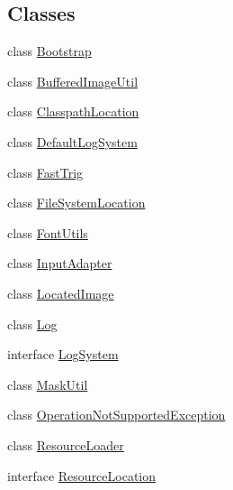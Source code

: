 \subsection*{Classes}
\begin{DoxyCompactItemize}
\item 
class \mbox{\hyperlink{classorg_1_1newdawn_1_1slick_1_1util_1_1_bootstrap}{Bootstrap}}
\item 
class \mbox{\hyperlink{classorg_1_1newdawn_1_1slick_1_1util_1_1_buffered_image_util}{Buffered\+Image\+Util}}
\item 
class \mbox{\hyperlink{classorg_1_1newdawn_1_1slick_1_1util_1_1_classpath_location}{Classpath\+Location}}
\item 
class \mbox{\hyperlink{classorg_1_1newdawn_1_1slick_1_1util_1_1_default_log_system}{Default\+Log\+System}}
\item 
class \mbox{\hyperlink{classorg_1_1newdawn_1_1slick_1_1util_1_1_fast_trig}{Fast\+Trig}}
\item 
class \mbox{\hyperlink{classorg_1_1newdawn_1_1slick_1_1util_1_1_file_system_location}{File\+System\+Location}}
\item 
class \mbox{\hyperlink{classorg_1_1newdawn_1_1slick_1_1util_1_1_font_utils}{Font\+Utils}}
\item 
class \mbox{\hyperlink{classorg_1_1newdawn_1_1slick_1_1util_1_1_input_adapter}{Input\+Adapter}}
\item 
class \mbox{\hyperlink{classorg_1_1newdawn_1_1slick_1_1util_1_1_located_image}{Located\+Image}}
\item 
class \mbox{\hyperlink{classorg_1_1newdawn_1_1slick_1_1util_1_1_log}{Log}}
\item 
interface \mbox{\hyperlink{interfaceorg_1_1newdawn_1_1slick_1_1util_1_1_log_system}{Log\+System}}
\item 
class \mbox{\hyperlink{classorg_1_1newdawn_1_1slick_1_1util_1_1_mask_util}{Mask\+Util}}
\item 
class \mbox{\hyperlink{classorg_1_1newdawn_1_1slick_1_1util_1_1_operation_not_supported_exception}{Operation\+Not\+Supported\+Exception}}
\item 
class \mbox{\hyperlink{classorg_1_1newdawn_1_1slick_1_1util_1_1_resource_loader}{Resource\+Loader}}
\item 
interface \mbox{\hyperlink{interfaceorg_1_1newdawn_1_1slick_1_1util_1_1_resource_location}{Resource\+Location}}
\end{DoxyCompactItemize}
